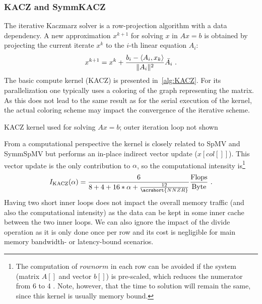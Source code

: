 \subsubsection{\acrshort{KACZ} and \acrshort{SymmKACZ}}
The iterative Kaczmarz solver is a row-projection algorithm with a data dependency.
A new approximation $x^{k+1}$ for solving $x$ in $Ax = b$ is obtained by projecting  the current iterate $x^{k}$ to the $i$-th linear equation $A_i$: 
\begin{equation}
	\label{eq:KACZ}
	x^{k+1} = x^{k} + \frac{b_i - \langle A_i, x_k \rangle}{\|A_i\|^2} \bar{A_i}\eos
\end{equation}
The basic compute kernel (\acrshort{KACZ}) is  presented in~\cref{alg:KACZ}. For its parallelization one typically uses a \DTWO coloring of the graph representing the matrix. As this does not lead to the same result as for the serial execution of the kernel, the actual coloring scheme may impact the convergence of the iterative scheme.

\begin{algorithm}[tbp]
	\caption{KACZ kernel used for solving $Ax=b$; outer iteration loop not shown} 
	\label{alg:KACZ}
	\begin{algorithmic}[1]
		\ENDFOR
		\ENDFOR
		\ENDFOR
	\end{algorithmic}
\end{algorithm}
From a computational perspective the kernel is closely related to \acrshort{SpMV} and \acrshort{SymmSpMV} but performs an in-place indirect vector update ($x[col[]]$). This vector update is the only contribution to $\alpha$, so the computational intensity is\footnote{The computation of $rownorm$ in each row can be avoided if the system  (matrix $A[]$ and vector $b[]$) is pre-scaled, which reduces the numerator from 6 to 4 \FLOP. Note, however, that the time to solution will remain the same, since this kernel is usually memory bound.}
\begin{equation}
\label{eq:KACZ_intensity}
I_\mathrm{KACZ} (\alpha) =  \frac{6}{8+4+16*\alpha+\frac{12}{\acrshort{NNZR}}} \frac{\FLOP}{\BYTE} \eos
\end{equation}
Having two short inner loops does not impact the overall memory traffic (and also the computational intensity) as the data can be kept in some inner cache  between the two inner loops. We can also ignore the impact of the divide operation as it is only done once per row and its cost is negligible for main memory bandwidth- or latency-bound scenarios.  

